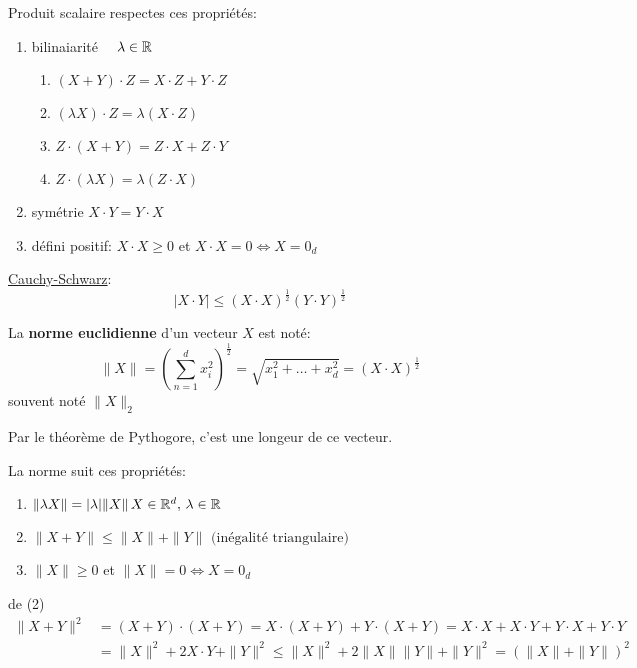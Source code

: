 \begin{prop}
    Produit scalaire respectes ces propriétés:
    \begin{enumerate}
        \item bilinaiarité $\quad \lambda \in \mathbb{R}$
            \begin{enumerate}
                \item $(X + Y) \cdot Z = X \cdot Z + Y \cdot Z$
                \item $(\lambda X) \cdot Z = \lambda (X \cdot Z)$
                \item $Z \cdot (X + Y) = Z \cdot X + Z \cdot Y$ 
                \item $Z \cdot (\lambda X) = \lambda (Z \cdot X)$
            \end{enumerate}
        \item symétrie $X \cdot Y = Y \cdot X$
        \item défini positif:  $X \cdot X \ge 0$ et $X \cdot X = 0 \iff X = 0_d$
    \end{enumerate}
\end{prop}
\begin{prop}
    \underline{Cauchy-Schwarz}:\\ 
    \[
        |X \cdot Y| \le (X \cdot X)^{\frac{1}{2}}(Y \cdot Y)^{\frac{1}{2}}
    \] 
\end{prop}
\begin{definition}\label{def:norm_eucl}
    La \textbf{norme euclidienne} d'un vecteur $X$ est noté:
   \[
       \|X\| = \left(\sum_{n=1}^{d} x_i^2\right)^{\frac{1}{2}} = \sqrt{x_1^2 + \ldots + x_d^2} = (X \cdot X)^{\frac{1}{2}}
   \] 
   souvent noté $\|X\|_2$
\end{definition}
\begin{intuition}
   Par le théorème de Pythogore, c'est une longeur de ce vecteur. 
\end{intuition}
\begin{prop}
    La norme suit ces propriétés:
   \begin{enumerate}
       \item $\|\lambda X\| = |\lambda|\|X\| \, X \in \mathbb{R}^d, \, \lambda \in \mathbb{R}$
       \item $\|X + Y\| \le \|X\| + \|Y\| \text{ (inégalité triangulaire)}$
       \item $\|X\| \ge 0$ et $\|X\| = 0 \iff X = 0_d$
   \end{enumerate}
\end{prop}
\begin{explanation}
    de (2)
    \begin{align*}
        \|X + Y\|^2 &= (X + Y)\cdot(X + Y) = X \cdot (X + Y) + Y \cdot (X + Y) = X \cdot X + X \cdot Y + Y \cdot X + Y \cdot Y\\
                    &= \|X\|^2 + 2X \cdot Y + \|Y\|^2 \le \|X\|^2 + 2\|X\| \|Y\| + \|Y\|^2 = (\|X\| + \|Y\|)^2
    \end{align*}
\end{explanation}
